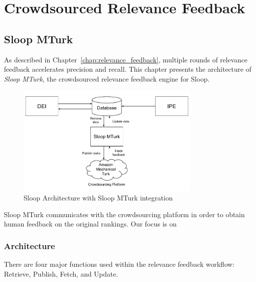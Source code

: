 \graphicspath{{./images/chap5/}}
\chapter{Crowdsourced Relevance Feedback}
\label{chap:sloop_mturk}
\section{Sloop MTurk}

As described in Chapter~\ref{chap:relevance_feedback}, multiple rounds of
relevance feedback accelerates precision and recall. This chapter presents the
architecture of \emph{Sloop MTurk}, the crowdsourced relevance feedback engine
for Sloop.

\begin{figure}[htb]
  \centering
  \includegraphics[width=0.8\textwidth]{sloop/turk_system}
  \caption{Sloop Architecture with Sloop MTurk integration}
  \label{fig:turk_overview} %
\end{figure}

Sloop MTurk communicates with the crowdsourcing platform in order to obtain
human feedback on the original rankings. Our focus is on

\subsection{Architecture}

There are four major functions used within the relevance feedback
workflow: Retrieve, Publish, Fetch, and Update.

